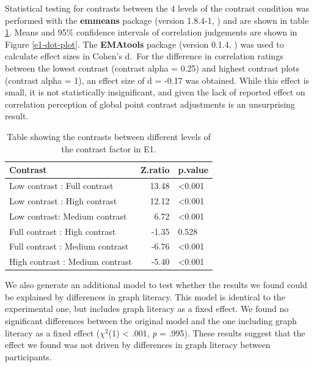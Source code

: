 \documentclass[preprint, 3p,
authoryear]{elsarticle} %
\begin{document}
Statistical testing for contrasts between the 4 levels of the contrast
condition was performed with the \textbf{emmeans} package (version
1.8.4-1, \citealp{emmeans}) and are shown in table
\ref{contrasts-table-e1}. Means and 95\% confidence intervals of
correlation judgements are shown in Figure \ref{e1-dot-plot}. The
\textbf{EMAtools} package (version 0.1.4, \citealp{ematools}) was used
to calculate effect sizes in Cohen's d.~For the difference in
correlation ratings between the lowest contrast (contrast alpha = 0.25)
and highest contrast plots (contrast alpha = 1), an effect size of d =
-0.17 was obtained. While this effect is small, it is not statistically
insignificant, and given the lack of reported effect on correlation
perception of global point contrast adjustments \citep{rensink_2012} is
an unsurprising result.

\begin{table}

\caption{\label{tab:contrasts-table-e1}\label{contrasts-table-e1}Table showing the contrasts between different levels of the contrast factor in E1.}
\centering
\begin{tabular}[t]{lrl}
\toprule
Contrast & Z.ratio & p.value\\
\midrule
Low contrast : Full contrast & 13.48 & <0.001\\
Low contrast : High contrast & 12.12 & <0.001\\
Low contrast: Medium contrast & 6.72 & <0.001\\
Full contrast : High contrast & -1.35 & 0.528\\
Full contrast : Medium contrast & -6.76 & <0.001\\
High contrast : Medium contrast & -5.40 & <0.001\\
\bottomrule
\end{tabular}
\end{table}

We also generate an additional model to test whether the results we
found could be explained by differences in graph literacy. This model is
identical to the experimental one, but includes graph literacy as a
fixed effect. We found no significant differences between the original
model and the one including graph literacy as a fixed effect
(\(\chi^2\)(1) \textless{} .001, \emph{p} = .995). These results suggest
that the effect we found was not driven by differences in graph literacy
between participants.
\end{document}
